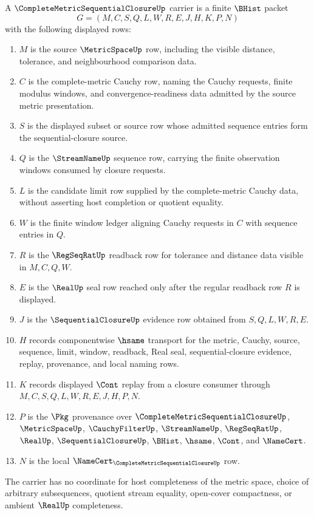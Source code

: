 \begin{definition}
\label{def:complete-metric-sequential-closure-carrier}
A $\CompleteMetricSequentialClosureUp$ carrier is a finite $\BHist$ packet
$$
G=(M,C,S,Q,L,W,R,E,J,H,K,P,N)
$$
with the following displayed rows:
\begin{enumerate}
\item $M$ is the source $\MetricSpaceUp$ row, including the visible distance, tolerance, and neighbourhood comparison data.
\item $C$ is the complete-metric Cauchy row, naming the Cauchy requests, finite modulus windows, and convergence-readiness data admitted by the source metric presentation.
\item $S$ is the displayed subset or source row whose admitted sequence entries form the sequential-closure source.
\item $Q$ is the $\StreamNameUp$ sequence row, carrying the finite observation windows consumed by closure requests.
\item $L$ is the candidate limit row supplied by the complete-metric Cauchy data, without asserting host completion or quotient equality.
\item $W$ is the finite window ledger aligning Cauchy requests in $C$ with sequence entries in $Q$.
\item $R$ is the $\RegSeqRatUp$ readback row for tolerance and distance data visible in $M,C,Q,W$.
\item $E$ is the $\RealUp$ seal row reached only after the regular readback row $R$ is displayed.
\item $J$ is the $\SequentialClosureUp$ evidence row obtained from $S,Q,L,W,R,E$.
\item $H$ records componentwise $\hsame$ transport for the metric, Cauchy, source, sequence, limit, window, readback, Real seal, sequential-closure evidence, replay, provenance, and local naming rows.
\item $K$ records displayed $\Cont$ replay from a closure consumer through $M,C,S,Q,L,W,R,E,J,H,P,N$.
\item $P$ is the $\Pkg$ provenance over $\CompleteMetricSequentialClosureUp$, $\MetricSpaceUp$, $\CauchyFilterUp$, $\StreamNameUp$, $\RegSeqRatUp$, $\RealUp$, $\SequentialClosureUp$, $\BHist$, $\hsame$, $\Cont$, and $\NameCert$.
\item $N$ is the local $\NameCert_{\CompleteMetricSequentialClosureUp}$ row.
\end{enumerate}
The carrier has no coordinate for host completeness of the metric space, choice of arbitrary subsequences, quotient stream equality, open-cover compactness, or ambient $\RealUp$ completeness.
\end{definition}


